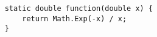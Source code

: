 \begin{lstlisting}
	static double function(double x) {
		return Math.Exp(-x) / x;
	}
\end{lstlisting}